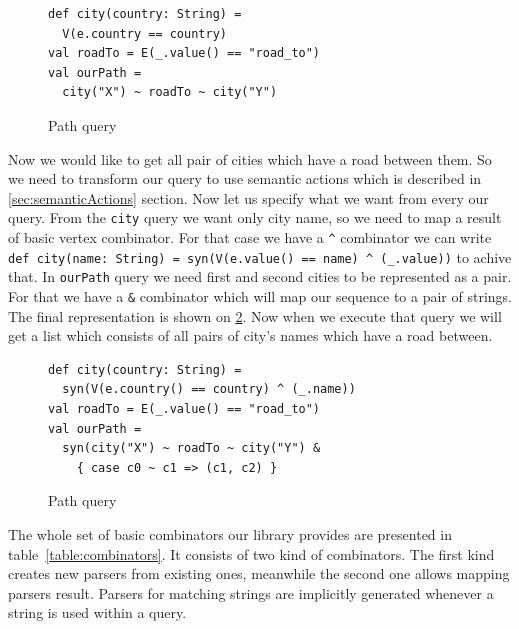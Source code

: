 \begin{figure}[h]
\begin{lstlisting}
def city(country: String) =
  V(e.country == country)
val roadTo = E(_.value() == "road_to")
val ourPath = 
  city("X") ~ roadTo ~ city("Y")
\end{lstlisting}
\caption{Path query}
\label{fig:simpleQuery}
\end{figure}



Now we would like to get all pair of cities which have a road between them. 
So we need to transform our query to use semantic actions which is described in \ref{sec:semanticActions} section. 
Now let us specify what we want from every our query. 
From the \lstinline{city} query we want only city name, so we need to map a result of basic vertex combinator. 
For that case we have a \lstinline{^} combinator we can write \lstinline{def city(name: String) = syn(V(e.value() == name) ^ (_.value))} to achive that. 
In \lstinline{ourPath} query we need first and second cities to be represented as a pair. 
For that we have a \lstinline{&} combinator which will map our sequence to a pair of strings.
The final representation is shown on \ref{fig:simpleQueryV2}. 
Now when we execute that query we will get a list which consists of all pairs of city's names which have a road between.

\begin{figure}[h]
\begin{lstlisting}
def city(country: String) =
  syn(V(e.country() == country) ^ (_.name))
val roadTo = E(_.value() == "road_to")
val ourPath = 
  syn(city("X") ~ roadTo ~ city("Y") &
    { case c0 ~ c1 => (c1, c2) }
\end{lstlisting}
\caption{Path query}
\label{fig:simpleQueryV2}
\end{figure}


The whole set of basic combinators our library provides are presented in table~\ref{table:combinators}. 
It consists of two kind of combinators. The first kind creates new parsers from existing ones, meanwhile the second one allows mapping parsers result.
Parsers for matching strings are implicitly generated whenever a string is used within a query. 



